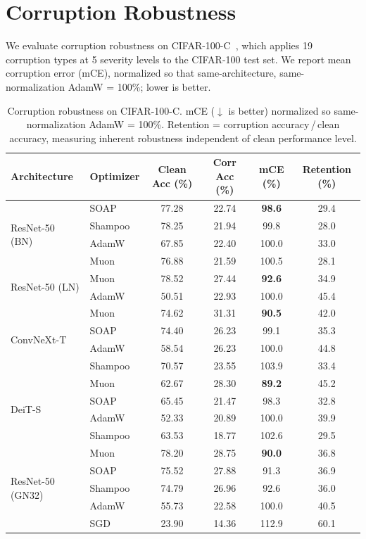 \section{Corruption Robustness}\label{sec:corruption_robustness}

We evaluate corruption robustness on CIFAR-100-C~\cite{hendrycks2019benchmarking}, which applies 19 corruption types at 5 severity levels to the CIFAR-100 test set. We report mean corruption error (mCE), normalized so that same-architecture, same-normalization AdamW = 100\%; lower is better.

\begin{table}[h]
\centering
\caption{Corruption robustness on CIFAR-100-C. mCE ($\downarrow$ is better) normalized so same-normalization AdamW = 100\%. Retention = corruption accuracy\,/\,clean accuracy, measuring inherent robustness independent of clean performance level.}
\label{tab:corruption_robustness}
\small
\begin{tabular}{llcccc}
\toprule
Architecture & Optimizer & Clean Acc (\%) & Corr Acc (\%) & mCE (\%) & Retention (\%) \\
\midrule
\multirow{4}{*}{ResNet-50 (BN)} & SOAP & 77.28 & 22.74 & \textbf{98.6} & 29.4 \\
 & Shampoo & 78.25 & 21.94 & 99.8 & 28.0 \\
 & AdamW & 67.85 & 22.40 & 100.0 & 33.0 \\
 & Muon & 76.88 & 21.59 & 100.5 & 28.1 \\
\midrule
\multirow{2}{*}{ResNet-50 (LN)} & Muon & 78.52 & 27.44 & \textbf{92.6} & 34.9 \\
 & AdamW & 50.51 & 22.93 & 100.0 & 45.4 \\
\midrule
\multirow{4}{*}{ConvNeXt-T} & Muon & 74.62 & 31.31 & \textbf{90.5} & 42.0 \\
 & SOAP & 74.40 & 26.23 & 99.1 & 35.3 \\
 & AdamW & 58.54 & 26.23 & 100.0 & 44.8 \\
 & Shampoo & 70.57 & 23.55 & 103.9 & 33.4 \\
\midrule
\multirow{4}{*}{DeiT-S} & Muon & 62.67 & 28.30 & \textbf{89.2} & 45.2 \\
 & SOAP & 65.45 & 21.47 & 98.3 & 32.8 \\
 & AdamW & 52.33 & 20.89 & 100.0 & 39.9 \\
 & Shampoo & 63.53 & 18.77 & 102.6 & 29.5 \\
\midrule
\multirow{5}{*}{ResNet-50 (GN32)} & Muon & 78.20 & 28.75 & \textbf{90.0} & 36.8 \\
 & SOAP & 75.52 & 27.88 & 91.3 & 36.9 \\
 & Shampoo & 74.79 & 26.96 & 92.6 & 36.0 \\
 & AdamW & 55.73 & 22.58 & 100.0 & 40.5 \\
 & SGD & 23.90 & 14.36 & 112.9 & 60.1 \\
\bottomrule
\end{tabular}
\end{table}

